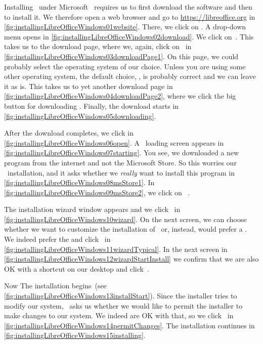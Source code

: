 %
%
Installing \libreoffice\ under Microsoft \windows\ requires us to first download the software and then to install it.
We therefore open a web browser and go to \url{https://libreoffice.org} in \cref{fig:installingLibreOfficeWindows01website}.
There, we click on .
A drop-down menu opens in \cref{fig:installingLibreOfficeWindows02download}.
We click on~.
This takes us to the download page, where we, again, click on~ in \cref{fig:installingLibreOfficeWindows03downloadPage1}.
On this page, we could probably select the operating system of our choice.
Unless you are using some other operating system, the default choice, , is probably correct and we can leave it as is.
This takes us to yet another download page in \cref{fig:installingLibreOfficeWindows04downloadPage2}, where we click the big button for downloading \libreoffice.
Finally, the download starts in \cref{fig:installingLibreOfficeWindows05downloading}.

After the download completes, we click  in \cref{fig:installingLibreOfficeWindows06open}.
A \windows\ loading screen appears in \cref{fig:installingLibreOfficeWindows07starting}.
You see, we downloaded a new program from the internet and not the Microsoft Store.
So this worries our \windows\ installation, and it asks whether we \emph{really} want to install this program in \cref{fig:installingLibreOfficeWindows08msStore1}.
In \cref{fig:installingLibreOfficeWindows09msStore2}, we click on ~.

The installation wizard window appears and we click~ in \cref{fig:installingLibreOfficeWindows10wizard}.
On the next screen, we can choose whether we want to customize the installation of \libreoffice\ or, instead, would prefer a .
We indeed prefer the  and click~ in \cref{fig:installingLibreOfficeWindows11wizardTypical}.
In the next screen in \cref{fig:installingLibreOfficeWindows12wizardStartInstall} we confirm that we are also OK with a shortcut on our desktop and click~.

Now The installation begins~(see \cref{fig:installingLibreOfficeWindows13installStart}).
Since the installer tries to modify our system, \windows\ asks us whether we would like to permit the installer to make changes to our system.
We indeed are OK with that, so we click~ in \cref{fig:installingLibreOfficeWindows14permitChanges}.
The installation continues in \cref{fig:installingLibreOfficeWindows15installing}.

